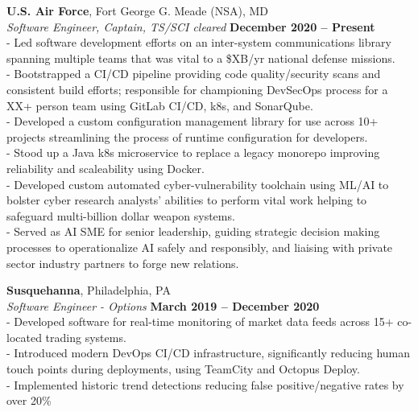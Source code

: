 \documentclass[margin,line]{resume}
\begin{document}
\begin{resume}
    \textbf{U.S. Air Force}, Fort George G. Meade (NSA), MD \vspace{2mm}\\\vspace{1mm}%
    \textsl{Software Engineer, Captain, TS/SCI cleared} \hfill \textbf{December 2020 -- Present}\\
    - Led software development efforts on an inter-system communications library spanning multiple teams that was vital to a \$XB/yr national defense missions.\vspace{1mm}\\%
    - Bootstrapped a CI/CD pipeline providing code quality/security scans and consistent build efforts; responsible for championing DevSecOps process for a XX+ person team using GitLab CI/CD, k8s, and SonarQube.\vspace{1mm}\\%
    - Developed a custom configuration management library for use across 10+ projects streamlining the process of runtime configuration for developers.\vspace{1mm}\\%
    - Stood up a Java k8s microservice to replace a legacy monorepo improving reliability and scaleability using Docker.\vspace{1mm}\\%
    - Developed custom automated cyber-vulnerability toolchain using ML/AI to bolster cyber research analysts' abilities to perform vital work helping to safeguard multi-billion dollar weapon systems.\vspace{1mm}\\%
    - Served as AI SME for senior leadership, guiding strategic decision making processes to operationalize AI safely and responsibly, and liaising with private sector industry partners to forge new relations.

    \textbf{Susquehanna}, Philadelphia, PA \vspace{2mm}\\\vspace{1mm}%
    \textsl{Software Engineer - Options} \hfill \textbf{March 2019 -- December 2020}\\
    - Developed software for real-time monitoring of market data feeds across 15+ co-located trading systems.\vspace{1mm}\\%
    - Introduced modern DevOps CI/CD infrastructure, significantly reducing human touch points during deployments, using TeamCity and Octopus Deploy.\vspace{1mm}\\%
    - Implemented historic trend detections reducing false positive/negative rates by over 20\%


\end{resume}
\end{document}
